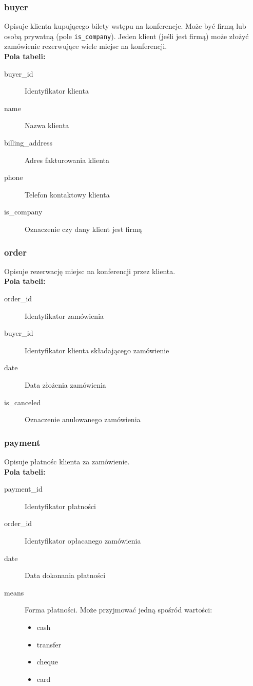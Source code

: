 \documentclass[12pt]{article}
\begin{document}



\subsubsection{buyer}

Opisuje klienta kupującego bilety wstępu na konferencje. Może być firmą lub osobą prywatną (pole \texttt{is\_company}). Jeden klient (jeśli jest firmą) może złożyć zamówienie rezerwujące wiele miejsc na konferencji. \\

\textbf{Pola tabeli:}
\begin{description}
\item [buyer\_id] Identyfikator klienta
\item [name] Nazwa klienta
\item [billing\_address] Adres fakturowania klienta
\item [phone] Telefon kontaktowy klienta
\item [is\_company] Oznaczenie czy dany klient jest firmą
\end{description}


\subsubsection{order}
Opisuje rezerwację miejsc na konferencji przez klienta.\\

\textbf{Pola tabeli:}
\begin{description}
\item [order\_id] Identyfikator zamówienia
\item [buyer\_id] Identyfikator klienta składającego zamówienie
\item [date] Data złożenia zamówienia
\item [is\_canceled] Oznaczenie anulowanego zamówienia
\end{description}


\subsubsection{payment}
Opisuje płatnośc klienta za zamówienie.\\

\textbf{Pola tabeli:}
\begin{description}
\item [payment\_id] Identyfikator płatności
\item [order\_id] Identyfikator opłacanego zamówienia
\item [date] Data dokonania płatności
\item [means] Forma płatności. Może przyjmować jedną spośród wartości:
  \begin{itemize}
  \item cash
  \item transfer
  \item cheque
  \item card
  \end{itemize}
\end{description}

\end{document}
